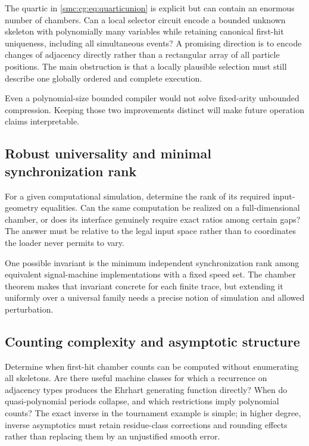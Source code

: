 \documentclass[11pt,letterpaper]{article}
\numberwithin{equation}{section}
\theoremstyle{definition}
\theoremstyle{remark}
\begin{document}
The quartic in \eqref{smc:cg:eq:quarticunion} is explicit but can contain an enormous
number of chambers. Can a local selector circuit encode a bounded unknown
skeleton with polynomially many variables while retaining canonical first-hit
uniqueness, including all simultaneous events? A promising direction is to
encode changes of adjacency directly rather than a rectangular array of all
particle positions. The main obstruction is that a locally plausible
selection must still describe one globally ordered and complete execution.

Even a polynomial-size bounded compiler would not solve fixed-arity
unbounded compression. Keeping those two improvements distinct will make
future operation claims interpretable.

\subsection{Robust universality and minimal synchronization rank}\label{smc:cg:q:robust}

For a given computational simulation, determine the rank of its required
input-geometry equalities. Can the same computation be realized on a
full-dimensional chamber, or does its interface genuinely require exact
ratios among certain gaps? The answer must be relative to the legal input
space rather than to coordinates the loader never permits to vary.

One possible invariant is the minimum independent synchronization rank
among equivalent signal-machine implementations with a fixed speed set.
The chamber theorem makes that invariant concrete for each finite trace,
but extending it uniformly over a universal family needs a precise notion
of simulation and allowed perturbation.

\subsection{Counting complexity and asymptotic structure}\label{smc:cg:q:counting}

Determine when first-hit chamber counts can be computed without enumerating
all skeletons. Are there useful machine classes for which a recurrence on
adjacency types produces the Ehrhart generating function directly? When do
quasi-polynomial periods collapse, and which restrictions imply polynomial
counts? The exact inverse in the tournament example is simple; in higher
degree, inverse asymptotics must retain residue-class corrections and
rounding effects rather than replacing them by an unjustified smooth error.
\end{document}
